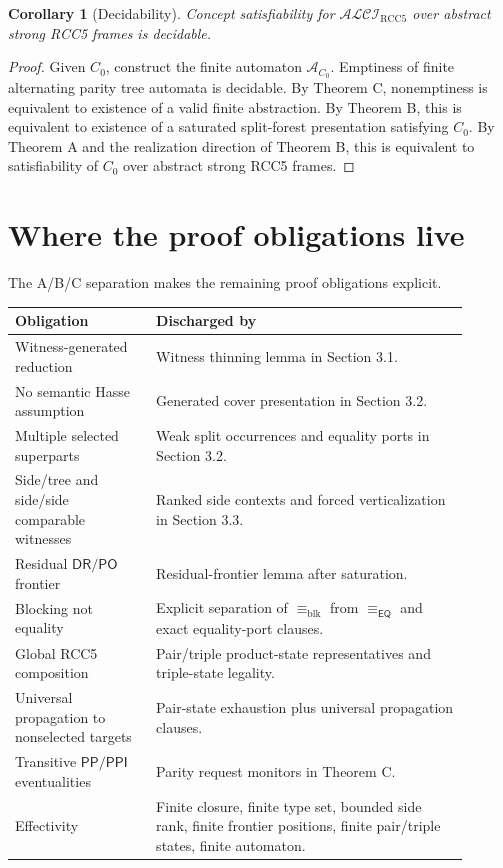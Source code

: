 \documentclass[11pt]{article}
\newtheorem{corollary}[theorem]{Corollary}
\newcommand{\ALCI}{\mathcal{ALCI}}
\newcommand{\RCC}{\mathrm{RCC5}}
\newcommand{\EQ}{\mathsf{EQ}}
\newcommand{\PP}{\mathsf{PP}}
\newcommand{\PPI}{\mathsf{PPI}}
\newcommand{\PO}{\mathsf{PO}}
\newcommand{\DR}{\mathsf{DR}}
\newcommand{\Aut}{\mathcal A}
\newcommand{\eqE}{\equiv_{\EQ}}
\newcommand{\blkE}{\equiv_{\mathrm{blk}}}
\begin{document}
\begin{corollary}[Decidability]
Concept satisfiability for $\ALCI_{\RCC}$ over abstract strong RCC5 frames is decidable.
\end{corollary}

\begin{proof}
Given $C_0$, construct the finite automaton $\Aut_{C_0}$.  Emptiness of finite alternating parity tree automata is decidable.  By Theorem C, nonemptiness is equivalent to existence of a valid finite abstraction.  By Theorem B, this is equivalent to existence of a saturated split-forest presentation satisfying $C_0$.  By Theorem A and the realization direction of Theorem B, this is equivalent to satisfiability of $C_0$ over abstract strong RCC5 frames.
\end{proof}

\section{Where the proof obligations live}

The A/B/C separation makes the remaining proof obligations explicit.

\begin{longtable}{p{0.28\linewidth}p{0.62\linewidth}}
\toprule
Obligation & Discharged by \\
\midrule
Witness-generated reduction & Witness thinning lemma in Section 3.1.\\
No semantic Hasse assumption & Generated cover presentation in Section 3.2.\\
Multiple selected superparts & Weak split occurrences and equality ports in Section 3.2.\\
Side/tree and side/side comparable witnesses & Ranked side contexts and forced verticalization in Section 3.3.\\
Residual $\DR/\PO$ frontier & Residual-frontier lemma after saturation.\\
Blocking not equality & Explicit separation of $\blkE$ from $\eqE$ and exact equality-port clauses.\\
Global RCC5 composition & Pair/triple product-state representatives and triple-state legality.\\
Universal propagation to nonselected targets & Pair-state exhaustion plus universal propagation clauses.\\
Transitive $\PP/\PPI$ eventualities & Parity request monitors in Theorem C.\\
Effectivity & Finite closure, finite type set, bounded side rank, finite frontier positions, finite pair/triple states, finite automaton.\\
\bottomrule
\end{longtable}
\end{document}
